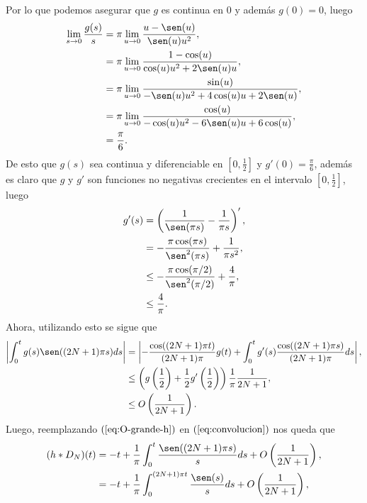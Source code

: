 Por lo que podemos asegurar que $g$ es continua en $0$ y además $g(0)=0$, luego
\begin{align*}
  \lim_{s \to 0}\frac{g(s)}{s}&=\pi\lim_{u \to 0}\frac{u-\sen(u)}{\sen(u)u^2},\\
  &=\pi \lim_{u \to 0}\frac{1-\cos(u)}{\cos(u)u^2+2\sen(u)u},\\
  &=\pi \lim_{u \to 0}\frac{\sin(u)}{-\sen(u)u^2+4\cos(u)u+2\sen(u)},\\
  &=\pi \lim_{u \to 0}\frac{\cos(u)}{-\cos(u)u^2-6\sen(u)u+6\cos(u)},\\
  &=\frac{\pi}{6}.
\end{align*}
De esto que $g(s)$ sea continua y diferenciable en $[0,\frac{1}{2}]$ y $g'(0)=\frac{\pi}{6}$, además es claro que $g$ y $g'$ son funciones no negativas crecientes en el intervalo $[0,\frac{1}{2}]$, luego
\begin{align*}
  g'(s)&=\left( \frac{1}{\sen(\pi s)}-\frac{1}{\pi s} \right)',\\
  &=-\frac{\pi\cos(\pi s)}{\sen^2(\pi s)}+\frac{1}{\pi s^2},\\
  &\leq -\frac{\pi\cos(\pi/2)}{\sen^2(\pi/2)}+\frac{4}{\pi},\\
  &\leq \frac{4}{\pi}.
\end{align*}
Ahora, utilizando esto se sigue que
\begin{equation}\label{eq:O-grande-h}
  \begin{split}
    \left|\int_{0}^{t}g(s)\sen((2N+1)\pi s)ds\right|&=\left|-\frac{\cos((2N+1)\pi t)}{(2N+1)\pi}g(t)+\int_{0}^{t}g'(s)\frac{\cos((2N+1)\pi s)}{(2N+1)\pi}ds\right|,\\
    &\leq \left(g\left(\frac{1}{2}\right)+\frac{1}{2}g'\left(\frac{1}{2}\right) \right)\frac{1}{\pi}\frac{1}{2N+1},\\
    &\leq O\left( \frac{1}{2N+1} \right).
  \end{split}
\end{equation}
Luego, reemplazando $(\ref{eq:O-grande-h})$ en $(\ref{eq:convolucion})$ nos queda que
\begin{equation}\label{eq:6}
  \begin{split}
    (h*D_{N})(t)&=-t+\frac{1}{\pi}\int_{0}^{t}  \frac{\sen((2N+1)\pi s)}{s}ds+O\left( \frac{1}{2N+1} \right),\\
    &=-t+\frac{1}{\pi}\int_{0}^{(2N+1)\pi t}  \frac{\sen(s)}{s}ds+O\left( \frac{1}{2N+1} \right),\\
  \end{split}
\end{equation}
